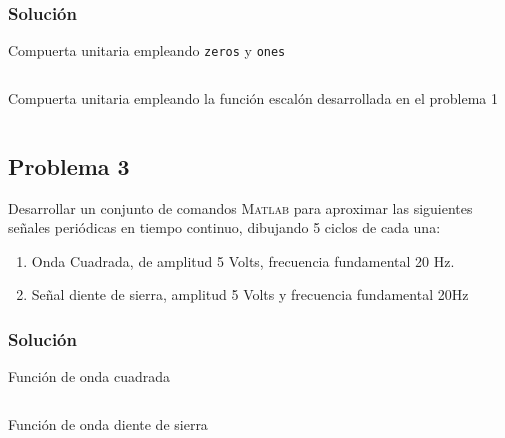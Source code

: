 \documentclass[a4paper,12pt,final]{article}
\begin{document}
    \subsubsection*{Solución}
      \begin{listing}[H]
        \caption{Compuerta unitaria empleando \texttt{zeros} y \texttt{ones}}
        \label{script02A}
        \inputminted[firstline=5]{matlab}{./laboratorio_2/problema02_a.m}
      \end{listing}

      \begin{listing}[H]
        \caption{Compuerta unitaria empleando la función escalón desarrollada en el problema 1}
        \label{script02B}
        \inputminted[firstline=5]{matlab}{./laboratorio_2/problema02_b.m}
      \end{listing}
      \vspace{\fill}

  \newpage
  \subsection*{Problema 3}
    \noindent Desarrollar un conjunto de comandos \textsc{Matlab} para
    aproximar las siguientes señales periódicas en tiempo continuo, dibujando
    5 ciclos de cada una:
    \begin{enumerate}
        \item Onda Cuadrada, de amplitud 5 Volts, frecuencia fundamental 20 Hz.
        \item Señal diente de sierra, amplitud 5 Volts y frecuencia fundamental 20Hz
    \end{enumerate}

    \subsubsection*{Solución}
      \begin{listing}[H]
        \caption{Función de onda cuadrada}
        \label{script03A}
        \inputminted{matlab}{./laboratorio_2/squarew.m}
      \end{listing}

      \begin{listing}[H]
        \caption{Función de onda diente de sierra}
        \label{script03B}
        \inputminted{matlab}{./laboratorio_2/saww.m}
      \end{listing}
\end{document}
